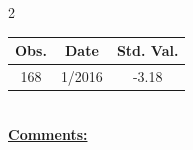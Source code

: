 
\bigskip 
\begin{multicols}{2}{ 
\begin{tabular}{ccc}
\hline  Obs.  &  Date &  Std. Val. \\ 
\hline 
                      168 &        1/2016 &         -3.18 \vspace{-.12in} \\  
 \end{tabular} 
\\ 
 \columnbreak 
 \singlespacing 
 \underline{\textbf{Comments:}} \\ 
 \bigskip       

 } 
\end{multicols} 
